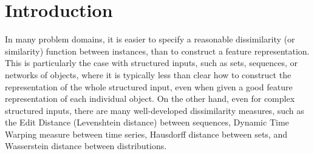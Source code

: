 \documentclass{article}
\newcommand{\1}{\mathbf{1}}
\begin{document}

\section{Introduction}

In many problem domains, it is easier to specify a reasonable dissimilarity (or similarity) function between instances, than to construct a feature representation. This is particularly the case with structured inputs, such as sets, sequences, or networks of objects, where it is typically less than clear how to construct the representation of the whole structured input, even when given a good feature representation of each individual object. On the other hand, even for complex structured inputs, there are many well-developed dissimilarity measures, such as the Edit Distance (Levenshtein distance) between sequences, Dynamic Time Warping measure between time series, Hausdorff distance between sets, and Wasserstein distance between distributions. 
\end{document}
